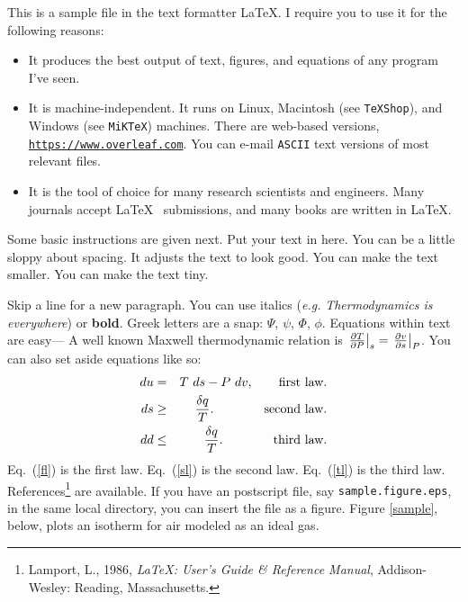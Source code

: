 \documentclass{article}
\begin{document}

\medskip
This is a sample file in the text formatter \LaTeX.
I require you to use it for the following reasons:

\begin{itemize}

\item{It produces the best output of text, figures,
      and equations of any
      program I've seen.}

\item{It is machine-independent. It runs on Linux, Macintosh (see {\tt TeXShop}), and Windows (see {\tt MiKTeX}) machines.  There are web-based versions, \href{https://www.overleaf.com}{\tt https://www.overleaf.com}.
     You can e-mail {\tt ASCII} text versions of most relevant files.}

\item{It is the tool of choice for many research
     scientists and engineers.
     Many journals accept 
     \LaTeX~ submissions, and many books
     are written in \LaTeX.}

\end{itemize}
\medskip
Some basic instructions are given next.
Put your text in here.  You can be a little sloppy    about
spacing.  It adjusts the text to look good.
{\small You can make the text smaller.}
{\tiny You can make the text tiny.}

Skip a line for a new paragraph.   
You can use italics ({\em e.g.} {\em  Thermodynamics is everywhere}) or {\bf bold}.
Greek letters are a snap: $\Psi$, $\psi$,
$\Phi$, $\phi$.  Equations within text are easy---
A well known Maxwell thermodynamic relation is
$\left.{\partial T \over \partial P}\right|_{s} = 
\left.{\partial v \over \partial s}\right|_{P}$.
You can also set aside equations like so:
\begin{eqnarray}
du &=& T\ ds -P\ dv, \qquad \mbox{first law.}\label{fl}\\
ds &\ge& {\delta q \over T}.\qquad  \qquad \mbox{second law.} \label{sl}\\
dd &\le& {\delta q \over T}.\qquad  \qquad \mbox{third law.} \label{tl}
\end{eqnarray}
Eq.~(\ref{fl}) is the first law.
Eq.~(\ref{sl}) is the second law.
Eq.~(\ref{tl}) is the third law.
References\footnote{Lamport, L., 1986, {\em \LaTeX: User's Guide \& Reference Manual},
    Addison-Wesley: Reading, Massachusetts.}
are available. 
If you have an postscript file, say {\tt sample.figure.eps}, in the same local directory,
you can insert the file as a figure.  Figure \ref{sample}, below, plots an isotherm for air modeled as an ideal gas. \\
\end{document}
